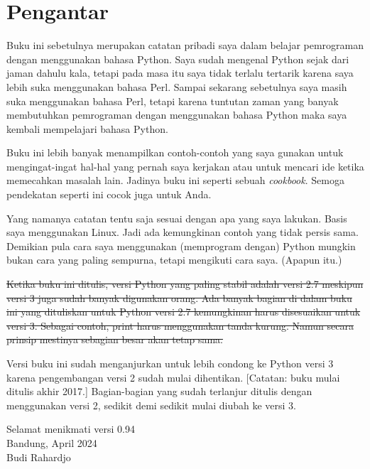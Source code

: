 \chapter*{Pengantar}
Buku ini sebetulnya merupakan catatan pribadi saya dalam belajar pemrograman
dengan menggunakan bahasa Python. Saya sudah mengenal Python sejak dari jaman
dahulu kala, tetapi pada masa itu saya tidak terlalu tertarik karena saya lebih
suka menggunakan bahasa Perl. Sampai sekarang sebetulnya saya masih suka
menggunakan bahasa Perl, tetapi karena tuntutan zaman yang banyak membutuhkan
pemrograman dengan menggunakan bahasa Python maka saya kembali mempelajari
bahasa Python.

Buku ini lebih banyak menampilkan contoh-contoh yang saya gunakan untuk
mengingat-ingat hal-hal yang pernah saya kerjakan atau untuk mencari ide ketika
memecahkan masalah lain. Jadinya buku ini seperti sebuah {\em cookbook}. Semoga
pendekatan seperti ini cocok juga untuk Anda.

Yang namanya catatan tentu saja sesuai dengan apa yang saya lakukan. Basis saya
menggunakan Linux. Jadi ada kemungkinan contoh yang tidak persis sama. Demikian
pula cara saya menggunakan (memprogram dengan) Python mungkin bukan cara yang
paling sempurna, tetapi mengikuti cara saya. (Apapun itu.)

\st{Ketika buku ini ditulis, versi Python yang paling stabil adalah versi 2.7
meskipun versi 3 juga sudah banyak digunakan orang. Ada banyak bagian di dalam
buku ini yang dituliskan untuk Python versi 2.7 kemungkinan harus disesuaikan
untuk versi 3. Sebagai contoh, print harus menggunakan tanda kurung.
Namun secara prinsip mestinya sebagian besar akan tetap sama.} 

Versi buku ini sudah menganjurkan untuk lebih condong ke Python versi 3
karena pengembangan versi 2 sudah mulai dihentikan.
[Catatan: buku mulai ditulis akhir 2017.]
Bagian-bagian yang sudah terlanjur ditulis dengan menggunakan versi 2,
sedikit demi sedikit mulai diubah ke versi 3.


Selamat menikmati versi 0.94\\
Bandung, April 2024 \\
Budi Rahardjo
